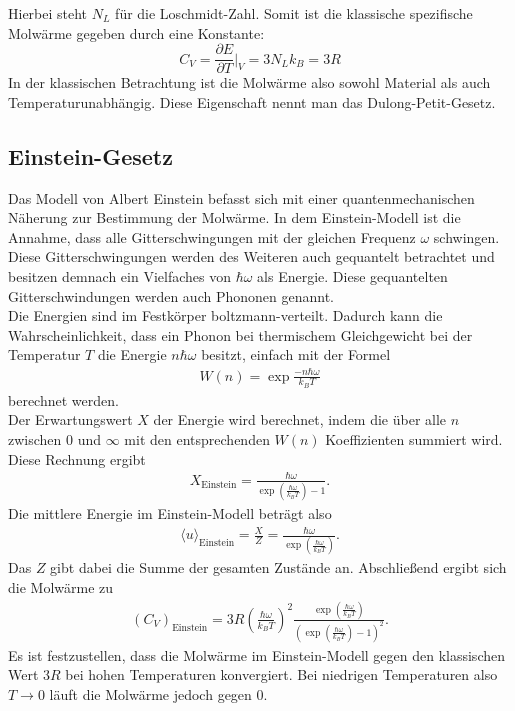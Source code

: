 Hierbei steht $N_L$ für die Loschmidt-Zahl. Somit ist die klassische spezifische Molwärme gegeben durch eine Konstante:
\begin{equation}
    C_V = \frac{\partial E}{\partial T} \bigg\vert_V = 3 N_L k_B = 3 R
\end{equation}
In der klassischen Betrachtung ist die Molwärme also sowohl Material als auch Temperaturunabhängig. Diese Eigenschaft nennt man das Dulong-Petit-Gesetz.
\subsection{Einstein-Gesetz}
\label{sec:einstein}

Das Modell von Albert Einstein befasst sich mit einer quantenmechanischen Näherung zur Bestimmung der Molwärme. In dem Einstein-Modell ist die Annahme, 
dass alle Gitterschwingungen mit der gleichen Frequenz $\omega$ schwingen. Diese Gitterschwingungen werden des Weiteren auch gequantelt betrachtet und besitzen demnach ein 
Vielfaches von $\hbar \omega$ als Energie. Diese gequantelten Gitterschwindungen werden auch Phononen genannt. \\

Die Energien sind im Festkörper boltzmann-verteilt. Dadurch kann die Wahrscheinlichkeit, dass ein Phonon bei thermischem Gleichgewicht bei der Temperatur $T$ die Energie $n \hbar \omega$ besitzt, 
einfach mit der Formel
\begin{align}
    \label{eqn:wn}
    W(n) = \exp{\frac{-n \hbar \omega}{k_B T}}
\end{align}
berechnet werden. \\
Der Erwartungswert $X$ der Energie wird berechnet, indem die über alle $n$ zwischen $0$ und $\infty$ mit den entsprechenden $W(n)$ Koeffizienten summiert wird. 
Diese Rechnung ergibt
\begin{align}
    X_{\text{Einstein}} = \frac{\hbar \omega}{\exp \left( \frac{\hbar \omega}{k_B T}\right) -1} .
\end{align} 
Die mittlere Energie im Einstein-Modell beträgt also 
\begin{align}
    \langle u \rangle_{\text{Einstein}} = \frac{X}{Z} = \frac{\hbar \omega }{\exp \left( \frac{\hbar \omega}{k_B T}\right)}.
\end{align}
Das $Z$ gibt dabei die Summe der gesamten Zustände an. Abschließend ergibt sich die Molwärme zu 
\begin{align}
    \label{eqn:moleinstein}
    (C_V)_{\text{Einstein}} = 3 R \left( \frac{\hbar \omega}{k_B T}\right)^2 \frac{\exp \left(\frac{\hbar \omega}{k_B T}\right)}{\left(\exp \left(\frac{\hbar \omega}{k_B T}\right) -1 \right)^2}.
\end{align}
Es ist festzustellen, dass die Molwärme im Einstein-Modell gegen den klassischen Wert $3 R$ bei hohen Temperaturen konvergiert. Bei niedrigen Temperaturen also $T \rightarrow 0$ läuft die Molwärme jedoch gegen $0$.
